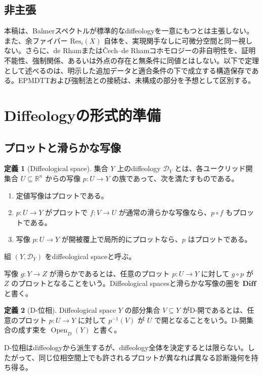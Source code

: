 \documentclass[a4paper,11pt]{ltjsarticle}
\theoremstyle{definition}
\newtheorem{definition}{定義}[section]
\theoremstyle{plain}
\newcommand{\Diff}{\mathbf{Diff}}
\newcommand{\Res}{\mathrm{Res}}
\newcommand{\OpenD}{\operatorname{Open}_{D}}
\begin{document}
\subsection{非主張}

本稿は、Balmerスペクトルが標準的なdiffeologyを一意にもつとは主張しない。また、余ファイバー $\Res_i(X)$ 自体を、実現関手なしに可微分空間と同一視しない。さらに、de Rhamまたは\v{C}ech--de Rhamコホモロジーの非自明性を、証明不能性、強制関係、あるいは外点の存在と無条件に同値とはしない。以下で定理として述べるのは、明示した追加データと適合条件の下で成立する構造保存である。EPMDTTおよび強制法との接続は、未構成の部分を予想として区別する。

\section{Diffeologyの形式的準備}

\subsection{プロットと滑らかな写像}

\begin{definition}[Diffeological space]
集合 $Y$ 上のdiffeology $\mathcal D_Y$ とは、各ユークリッド開集合 $U\subseteq\mathbb R^n$ からの写像 $p:U\to Y$ の族であって、次を満たすものである。
\begin{enumerate}
 \item 定値写像はプロットである。
 \item $p:U\to Y$ がプロットで $f:V\to U$ が通常の滑らかな写像なら、$p\circ f$ もプロットである。
 \item 写像 $p:U\to Y$ が開被覆上で局所的にプロットなら、$p$ はプロットである。
\end{enumerate}
組 $(Y,\mathcal D_Y)$ をdiffeological spaceと呼ぶ。
\end{definition}

写像 $g:Y\to Z$ が滑らかであるとは、任意のプロット $p:U\to Y$ に対して $g\circ p$ が $Z$ のプロットとなることをいう。Diffeological spacesと滑らかな写像の圏を $\Diff$ と書く\cite{IglesiasZemmour2025Why}。

\begin{definition}[D-位相]
Diffeological space $Y$ の部分集合 $V\subseteq Y$ がD-開であるとは、任意のプロット $p:U\to Y$ に対して $p^{-1}(V)$ が $U$ で開となることをいう。D-開集合の成す束を $\OpenD(Y)$ と書く。
\end{definition}

D-位相はdiffeologyから派生するが、diffeology全体を決定するとは限らない。したがって、同じ位相空間上でも許されるプロットが異なれば異なる診断幾何を持ち得る。
\end{document}
